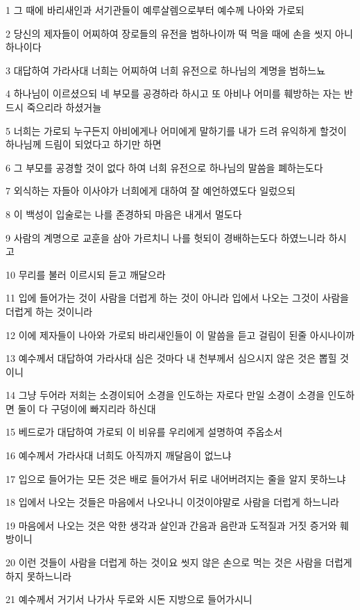 \par 1 그 때에 바리새인과 서기관들이 예루살렘으로부터 예수께 나아와 가로되
\par 2 당신의 제자들이 어찌하여 장로들의 유전을 범하나이까 떡 먹을 때에 손을 씻지 아니하나이다
\par 3 대답하여 가라사대 너희는 어찌하여 너희 유전으로 하나님의 계명을 범하느뇨
\par 4 하나님이 이르셨으되 네 부모를 공경하라 하시고 또 아비나 어미를 훼방하는 자는 반드시 죽으리라 하셨거늘
\par 5 너희는 가로되 누구든지 아비에게나 어미에게 말하기를 내가 드려 유익하게 할것이 하나님께 드림이 되었다고 하기만 하면
\par 6 그 부모를 공경할 것이 없다 하여 너희 유전으로 하나님의 말씀을 폐하는도다
\par 7 외식하는 자들아 이사야가 너희에게 대하여 잘 예언하였도다 일렀으되
\par 8 이 백성이 입술로는 나를 존경하되 마음은 내게서 멀도다
\par 9 사람의 계명으로 교훈을 삼아 가르치니 나를 헛되이 경배하는도다 하였느니라 하시고
\par 10 무리를 불러 이르시되 듣고 깨달으라
\par 11 입에 들어가는 것이 사람을 더럽게 하는 것이 아니라 입에서 나오는 그것이 사람을 더럽게 하는 것이니라
\par 12 이에 제자들이 나아와 가로되 바리새인들이 이 말씀을 듣고 걸림이 된줄 아시나이까
\par 13 예수께서 대답하여 가라사대 심은 것마다 내 천부께서 심으시지 않은 것은 뽑힐 것이니
\par 14 그냥 두어라 저희는 소경이되어 소경을 인도하는 자로다 만일 소경이 소경을 인도하면 둘이 다 구덩이에 빠지리라 하신대
\par 15 베드로가 대답하여 가로되 이 비유를 우리에게 설명하여 주옵소서
\par 16 예수께서 가라사대 너희도 아직까지 깨달음이 없느냐
\par 17 입으로 들어가는 모든 것은 배로 들어가서 뒤로 내어버려지는 줄을 알지 못하느냐
\par 18 입에서 나오는 것들은 마음에서 나오나니 이것이야말로 사람을 더럽게 하느니라
\par 19 마음에서 나오는 것은 악한 생각과 살인과 간음과 음란과 도적질과 거짓 증거와 훼방이니
\par 20 이런 것들이 사람을 더럽게 하는 것이요 씻지 않은 손으로 먹는 것은 사람을 더럽게 하지 못하느니라
\par 21 예수께서 거기서 나가사 두로와 시돈 지방으로 들어가시니
